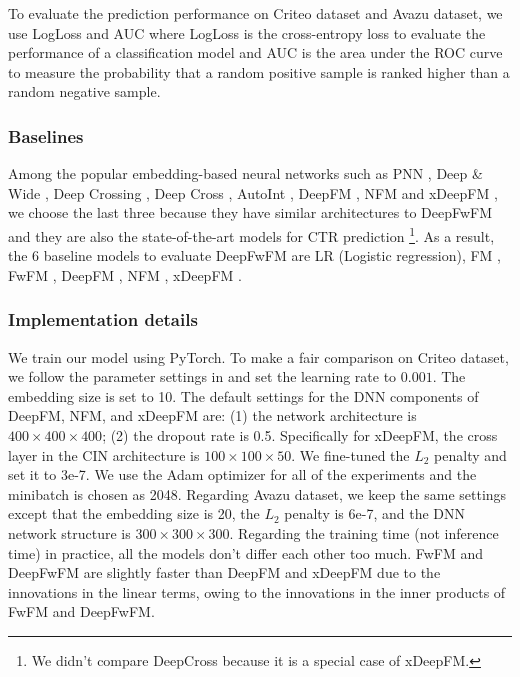 \documentclass[sigconf]{acmart}
\begin{document}
To evaluate the prediction performance on Criteo dataset and Avazu dataset, we use LogLoss and AUC where LogLoss is the cross-entropy loss to evaluate the performance of a classification model and AUC is the area under the ROC curve to measure the probability that a random positive sample is ranked higher than a random negative sample. 




\subsubsection{Baselines}

Among the popular embedding-based neural networks such as PNN \cite{PNN}, Deep \& Wide \cite{deepwide}, Deep Crossing \cite{deepcrossing}, Deep Cross \cite{deepcross}, AutoInt \cite{autoint}, DeepFM \cite{deepfm}, NFM \cite{NFM} and xDeepFM \cite{xdeepfm}, we choose the last three because they have similar architectures to DeepFwFM and they are also the state-of-the-art models for CTR prediction \footnote{We didn't compare DeepCross because it is a special case of xDeepFM.}. As a result, the 6 baseline models to evaluate DeepFwFM are LR (Logistic regression), FM \cite{FM}, FwFM \cite{fwfm}, DeepFM \cite{deepfm}, NFM \cite{NFM}, xDeepFM \cite{xdeepfm}. 


\subsubsection{Implementation details}

We train our model using PyTorch. To make a fair comparison on Criteo dataset, we follow the parameter settings in \cite{deepfm, xdeepfm} and set the learning rate to $0.001$. The embedding size is set to 10. The default settings for the DNN components of DeepFM, NFM, and xDeepFM are: (1) the network architecture is $400\times 400\times 400$; (2) the dropout rate is 0.5. Specifically for xDeepFM, the cross layer in the CIN architecture is $100\times 100 \times 50$. We fine-tuned the $L_2$ penalty and set it to 3e-7. We use the Adam optimizer \cite{adam} for all of the experiments and the minibatch is chosen as 2048. Regarding Avazu dataset, we keep the same settings except that the embedding size is 20, the $L_2$ penalty is 6e-7, and the DNN network structure is $300\times 300\times 300$. Regarding the training time (not inference time) in practice, all the models don't differ each other too much. FwFM and DeepFwFM are slightly faster than DeepFM and xDeepFM due to the innovations in the linear terms, owing to the innovations in the inner products of FwFM and DeepFwFM.
\end{document}
